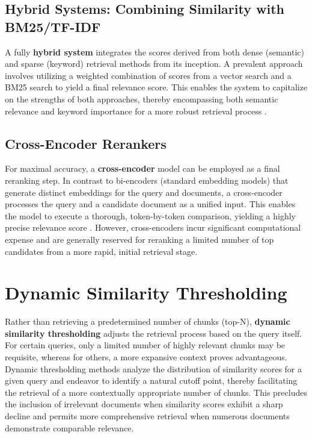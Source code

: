 \subsection{Hybrid Systems: Combining Similarity with BM25/TF-IDF}
A fully \textbf{hybrid system} integrates the scores derived from both dense (semantic) and sparse (keyword) retrieval methods from its inception. A prevalent approach involves utilizing a weighted combination of scores from a vector search and a BM25 search to yield a final relevance score. This enables the system to capitalize on the strengths of both approaches, thereby encompassing both semantic relevance and keyword importance for a more robust retrieval process \autocite{gao2024retrievalaugmented}.

\subsection{Cross-Encoder Rerankers}
For maximal accuracy, a \textbf{cross-encoder} model can be employed as a final reranking step. In contrast to bi-encoders (standard embedding models) that generate distinct embeddings for the query and documents, a cross-encoder processes the query and a candidate document as a unified input. This enables the model to execute a thorough, token-by-token comparison, yielding a highly precise relevance score \autocite{khattab2020colbert}. However, cross-encoders incur significant computational expense and are generally reserved for reranking a limited number of top candidates from a more rapid, initial retrieval stage.

\section{Dynamic Similarity Thresholding}
Rather than retrieving a predetermined number of chunks (top-N), \textbf{dynamic similarity thresholding} adjusts the retrieval process based on the query itself. For certain queries, only a limited number of highly relevant chunks may be requisite, whereas for others, a more expansive context proves advantageous. Dynamic thresholding methods analyze the distribution of similarity scores for a given query and endeavor to identify a natural cutoff point, thereby facilitating the retrieval of a more contextually appropriate number of chunks. This precludes the inclusion of irrelevant documents when similarity scores exhibit a sharp decline and permits more comprehensive retrieval when numerous documents demonstrate comparable relevance.

